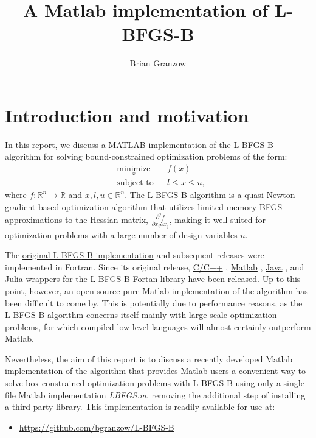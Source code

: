 \documentclass[11pt]{article}
\title{A Matlab implementation of L-BFGS-B}
\author{Brian Granzow}
\date{}
\begin{document}
\maketitle

\section{Introduction and motivation}
In this report, we discuss a MATLAB implementation of
the L-BFGS-B \cite{lbfgsb} algorithm for solving
bound-constrained optimization problems of the form:
%
\begin{equation}
\begin{aligned}
& \underset{x}{\text{minimize}}
& & f(x) \\
& \text{subject to}
& & l \leq x \leq u,
\end{aligned}
\end{equation}
%
where $f: \mathbb{R}^n \to \mathbb{R}$ and $x,l,u \in \mathbb{R}^n$.
The L-BFGS-B algorithm is a quasi-Newton gradient-based
optimization algorithm that utilizes limited memory
BFGS approximations to the Hessian matrix,
$\frac{\partial^2 f}{\partial x_i \partial x_j}$, making
it well-suited for optimization problems with a large
number of design variables $n$.

The \href{http://users.iems.northwestern.edu/~nocedal/lbfgsb.html}
{original L-BFGS-B implementation}  \cite{lbfgsb3}
and subsequent releases were implemented in Fortran.
Since its original release,
\href{https://github.com/stephenbeckr/L-BFGS-B-C}{C/C++}
\cite{C},
\href{https://github.com/pcarbo/lbfgsb-matlab}{Matlab}
\cite{Matlab},
\href{https://github.com/mkobos/lbfgsb_wrapper}{Java}
\cite{Java},
and \href{https://github.com/yuhonglin/Lbfgsb.jl}{Julia}
\cite{Julia}
wrappers for the L-BFGS-B Fortan library have been released.
Up to this point, however, an open-source pure Matlab
implementation of the algorithm has been difficult to
come by. This is potentially due to performance reasons,
as the L-BFGS-B algorithm concerns itself mainly with large
scale optimization problems, for which compiled low-level
languages will almost certainly outperform Matlab.

Nevertheless, the aim of this report is to discuss a
recently developed Matlab implementation of the algorithm
that provides Matlab users a convenient way to solve
box-constrained optimization problems with L-BFGS-B using
only a single file Matlab implementation \emph{LBFGS.m},
removing the additional step of installing a third-party
library. This implementation is readily available for use at:
\begin{itemize}
\item \url{https://github.com/bgranzow/L-BFGS-B}{}
\end{itemize}
\end{document}
